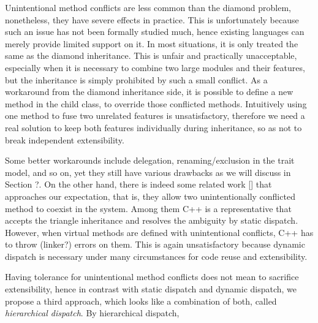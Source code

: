 Unintentional method conflicts are less common than the diamond problem, nonetheless, they have severe effects in practice. This
is unfortunately because such an issue has not been formally studied much, hence existing languages can merely provide limited support on it.
In most situations, it is only treated the same as the diamond inheritance. This is unfair and practically unacceptable, especially when it is
necessary to combine two large modules and their features, but the inheritance is simply prohibited by such a small conflict. As a workaround from the diamond inheritance side, it is possible to define a new method in the child class, to override those conflicted methods. Intuitively using one method to fuse two unrelated features is unsatisfactory, therefore we need a real solution to keep both features individually during inheritance,
so as not to break independent extensibility.

Some better workarounds include delegation, renaming/exclusion in the trait model, and so on, yet they still have various drawbacks as we will discuss in Section ?. On the other hand, there is indeed some related work [] that approaches our expectation, that is, they allow two unintentionally conflicted method to coexist in the system. Among them C++ is a representative that accepts the triangle inheritance and resolves the ambiguity by static dispatch. However, when virtual methods are defined with unintentional conflicts, C++ has to throw (linker?) errors on them.
This is again unsatisfactory because dynamic dispatch is necessary under many circumstances for code reuse and extensibility.

Having tolerance for unintentional method conflicts does not mean to sacrifice extensibility, hence in contrast with static dispatch and dynamic dispatch, we propose a third approach, which looks like a combination of both, called \textit{hierarchical dispatch}. By hierarchical dispatch, 

 